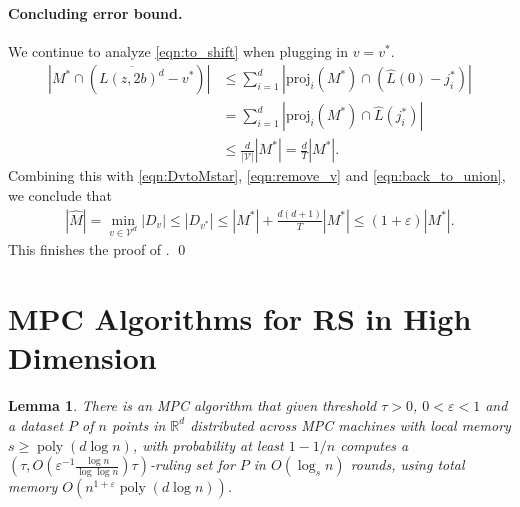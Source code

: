 \documentclass[11pt,letterpaper]{article}
\theoremstyle{plain}
\newtheorem{lemma}[theorem]{Lemma}
\theoremstyle{definition}
\theoremstyle{remark}
\DeclareMathOperator{\poly}{poly}
\newcommand{\proj}{\ensuremath{\mathrm{proj}}\xspace}
\renewcommand{\epsilon}{\ensuremath{\varepsilon}}
\let\epsilon\varepsilon
\begin{document}
\paragraph{Concluding error bound.}
We continue to analyze \eqref{eqn:to_shift} when plugging in $v = v^*$.
\begin{align*}
    |M^* \cap (\overline{L(z, 2b)^d} - v^*)|
    &\leq \sum_{i = 1}^d |\proj_i(M^*) \cap (\hat{L}(0) - j_i^*)| \\
    &= \sum_{i = 1}^d |\proj_i(M^*) \cap \hat{L}(j_i^*)| \\
    &\leq \frac{d}{|\mathcal{V}|} |M^*|
    = \frac{d}{T} |M^*|.
\end{align*}
Combining this with \eqref{eqn:DvtoMstar}, \eqref{eqn:remove_v} and \eqref{eqn:back_to_union},
we conclude that
\begin{align*}
    |\widehat{M}| = \min_{v \in \mathcal{V}^d} |D_v|
    \leq |D_{v^*}| \leq |M^*| + \frac{d(d + 1)}{T} |M^*|
    \leq (1 + \epsilon) |M^*|.
\end{align*}
This finishes the proof of .
\qed














     \section{MPC Algorithms for RS in High Dimension}
\label{sec:ruling_set}



\begin{lemma}
    \label{thm:ruling_set}
    There is an MPC algorithm that given threshold $\tau>0$,  $0<\varepsilon<1$ and a dataset $P$ of $n$ points in $\mathbb{R}^{d}$ distributed across MPC machines with local memory $s\geq \poly(d\log n)$, with probability at least $1-1/n$ computes a $(\tau, O(\varepsilon^{-1}\frac{\log n}{\log\log n})\tau)$-ruling set for $P$ in $O(\log_{s} n)$ rounds, using total memory $O(n^{1+\varepsilon}\poly(d\log n))$.    
\end{lemma}
\end{document}
